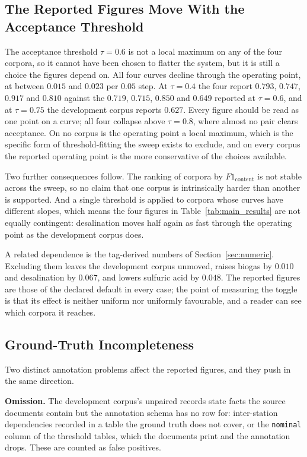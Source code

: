 \documentclass[11pt]{article}
\begin{document}
\subsection{The Reported Figures Move With the Acceptance Threshold}
\label{sec:lim_threshold}
The acceptance threshold $\tau = 0.6$ is not a local maximum on any of the four
corpora, so it cannot have been chosen to flatter the system, but it is still a
choice the figures depend on. All four curves decline through the operating
point, at between $0.015$ and $0.023$ per $0.05$ step. At $\tau = 0.4$ the four
report $0.793$, $0.747$, $0.917$ and $0.810$ against the $0.719$, $0.715$,
$0.850$ and $0.649$ reported at $\tau = 0.6$, and at $\tau = 0.75$ the
development corpus reports $0.627$. Every figure should be read as one point on
a curve; all four collapse above $\tau = 0.8$, where almost no pair clears
acceptance. On no corpus is the operating point
a local maximum, which is the specific form of threshold-fitting the sweep exists
to exclude, and on every corpus the reported operating point is the more
conservative of the choices available.

Two further consequences follow. The ranking of corpora by $F1_{\text{content}}$
is not stable across the sweep, so no claim that one corpus is intrinsically
harder than another is supported. And a single threshold is applied to corpora
whose curves have different slopes, which means the four figures in
Table~\ref{tab:main_results} are not equally contingent: desalination moves half
again as fast through the operating point as the development corpus does.

A related dependence is the tag-derived numbers of
Section~\ref{sec:numeric}. Excluding them leaves the development corpus
unmoved, raises biogas by $0.010$ and desalination by $0.067$, and lowers
sulfuric acid by $0.048$. The reported figures are those of the declared default in every case;
the point of measuring the toggle is that its effect is neither uniform nor
uniformly favourable, and a reader can see which corpora it reaches.

\subsection{Ground-Truth Incompleteness}
\label{sec:lim_gt}
Two distinct annotation problems affect the reported figures, and they push in
the same direction.

\textbf{Omission.} The development corpus's unpaired records state facts the
source documents contain but the annotation schema has no row for:
inter-station dependencies recorded in a table the ground truth does not cover,
or the \texttt{nominal} column of the threshold tables, which the documents
print and the annotation drops. These are counted as false positives.
\end{document}
